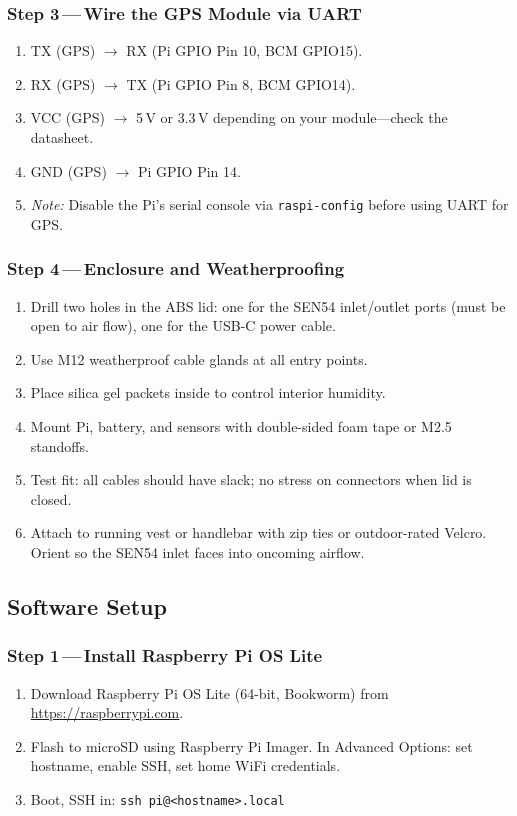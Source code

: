 \documentclass[11pt, letterpaper]{article}
\begin{document}
\subsubsection{Step 3\,---\,Wire the GPS Module via UART}
\begin{enumerate}
  \item TX (GPS) $\to$ RX (Pi GPIO Pin 10, BCM GPIO15).
  \item RX (GPS) $\to$ TX (Pi GPIO Pin 8, BCM GPIO14).
  \item VCC (GPS) $\to$ 5\,V or 3.3\,V depending on your module---check the datasheet.
  \item GND (GPS) $\to$ Pi GPIO Pin 14.
  \item \textit{Note:} Disable the Pi's serial console via \texttt{raspi-config} before using UART for GPS.
\end{enumerate}

\subsubsection{Step 4\,---\,Enclosure and Weatherproofing}
\begin{enumerate}
  \item Drill two holes in the ABS lid: one for the SEN54 inlet/outlet ports (must be open to air flow), one for the USB-C power cable.
  \item Use M12 weatherproof cable glands at all entry points.
  \item Place silica gel packets inside to control interior humidity.
  \item Mount Pi, battery, and sensors with double-sided foam tape or M2.5 standoffs.
  \item Test fit: all cables should have slack; no stress on connectors when lid is closed.
  \item Attach to running vest or handlebar with zip ties or outdoor-rated Velcro. Orient so the SEN54 inlet faces into oncoming airflow.
\end{enumerate}

\subsection{Software Setup}
\label{sec:software}

\subsubsection{Step 1\,---\,Install Raspberry Pi OS Lite}
\begin{enumerate}
  \item Download Raspberry Pi OS Lite (64-bit, Bookworm) from \url{https://raspberrypi.com}.
  \item Flash to microSD using Raspberry Pi Imager. In Advanced Options: set hostname, enable SSH, set home WiFi credentials.
  \item Boot, SSH in: \texttt{ssh pi@<hostname>.local}
\end{enumerate}
\end{document}
